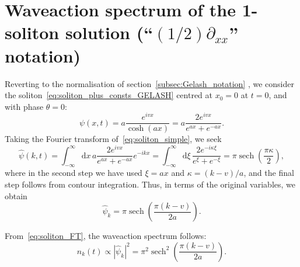 \documentclass[11pt,a4paper]{article}
\DeclareMathOperator{\sech}{sech}
\begin{document}
\section{Waveaction spectrum of the 1-soliton solution (``$(1/2)\partial_{xx}$'' notation)}

Reverting to the normalisation of section~\ref{subsec:Gelash_notation} , we consider the soliton~\eqref{eq:soliton_plus_consts_GELASH} centred at $x_0=0$ at $t=0$, and with phase $\theta=0$:
\begin{equation}
	\label{eq:soliton_simple}
	\psi(x,t) = a \frac{e^{ivx}}{\cosh(ax)} = a \frac{2e^{ivx}}{e^{ax}+e^{-ax}}.
\end{equation}
Taking the Fourier transform of~\eqref{eq:soliton_simple}, we seek
\begin{equation*}
	\hat{\psi}(k,t) =   \int_{-\infty}^\infty \!\mathrm{d}x \,   a \frac{2e^{ivx}}{e^{ax}+e^{-ax}} e^{-ikx}
						=  \int_{-\infty}^\infty \!\mathrm{d}\xi\,    \frac{2e^{-i\kappa\xi}}{e^\xi+e^{-\xi}}
						= \pi \sech\left( \frac{\pi\kappa}{2} \right),
\end{equation*}
where in the second step we have used $\xi = ax$ and $\kappa = (k-v)/a$, and the final step follows from contour integration.
Thus, in terms of the original variables, we obtain
\begin{equation}
	\label{eq:soliton_FT}
	\hat{\psi}_k = \pi \sech\left( \frac{\pi(k-v)}{2a} \right).
\end{equation}

From~\eqref{eq:soliton_FT}, the waveaction spectrum follows:
\begin{equation}
	\label{eq:soliton_nk}
	n_k(t) \propto |\hat{\psi}_k|^2 = \pi^2 \sech^2\left( \frac{\pi(k-v)}{2a} \right).
\end{equation}
\end{document}
